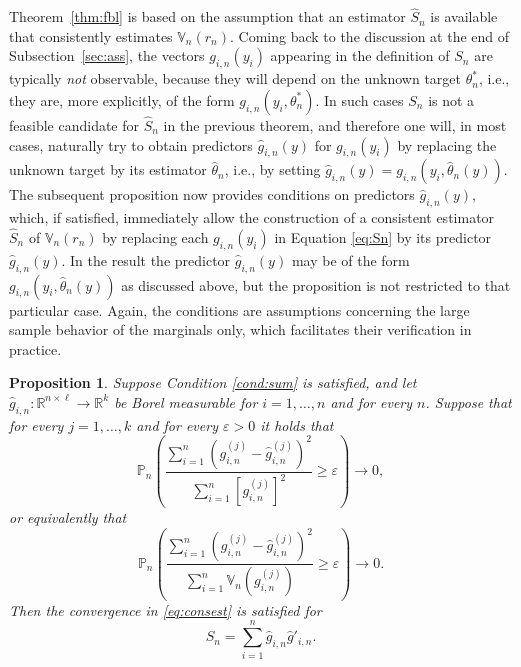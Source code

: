 \documentclass[preprint]{imsart}
\newcommand{\R}{{\mathbb R}}
\newtheorem{proposition}[theorem]{Proposition}
\numberwithin{equation}{section}
\begin{document}
Theorem~\ref{thm:fbl} is based on the assumption that an estimator $\hat{S}_n$ is available that consistently estimates $\mathbb{V}_n(r_n)$. Coming back to the discussion at the end of Subsection~\ref{sec:ass}, the vectors $g_{i,n}(y_i)$ appearing in the definition of $S_n$ are typically \textit{not} observable, because they will depend on the unknown target $\theta^*_n$, i.e., they are, more explicitly, of the form $g_{i,n}(y_i, \theta^*_n)$. In such cases $S_n$ is not a feasible candidate for $\hat{S}_n$ in the previous theorem, and therefore one will, in most cases, naturally try to obtain predictors $\hat{g}_{i,n}(y)$ for $g_{i,n}(y_i)$ by replacing the unknown target by its estimator $\hat{\theta}_n$, i.e., by setting $\hat{g}_{i,n}(y) = g_{i,n}(y_i, \hat{\theta}_n(y))$. The subsequent proposition now provides conditions on predictors $\hat{g}_{i,n}(y)$, which, if satisfied, immediately allow the construction of a consistent estimator $\hat{S}_n$ of $\mathbb{V}_n(r_n)$ by replacing each $g_{i,n}(y_i)$ in Equation \eqref{eq:Sn} by its predictor  $\hat{g}_{i,n}(y)$. In the result the predictor $\hat{g}_{i,n}(y)$ may be of the form $g_{i,n}(y_i, \hat{\theta}_n(y))$ as discussed above, but the proposition is not restricted to that particular case. Again, the conditions are assumptions concerning the large sample behavior of the marginals only, which facilitates their verification in practice.
%
\begin{proposition}\label{prop:obtest}
Suppose Condition \ref{cond:sum} is satisfied, and let $\hat{g}_{i,n}: \R^{n \times \ell} \to \R^k$ be Borel measurable for $i = 1, \hdots, n$ and for every $n$. Suppose that for every $j = 1, \hdots, k$ and for every $\varepsilon > 0$ it holds that
%
%
\begin{equation}\label{eq:negldiff}
\mathbb{P}_n \left( \frac{\sum_{i = 1}^n \left(g_{i,n}^{(j)} -  \hat{g}_{i,n}^{(j)} \right)^2}{\sum_{i = 1}^n [g_{i,n}^{(j)}]^2} \geq \varepsilon \right) \to 0, 
\end{equation}
%
or equivalently that 
%
\begin{equation}\label{eq:negldiff2}
\mathbb{P}_n \left( \frac{\sum_{i = 1}^n \left(g_{i,n}^{(j)} -  \hat{g}_{i,n}^{(j)} \right)^2}{\sum_{i = 1}^n \mathbb{V}_n \left( g_{i,n}^{(j)}\right)} \geq \varepsilon \right) \to 0.
\end{equation}
% 
Then the convergence in \eqref{eq:consest} is satisfied for
%
\begin{equation*}
\hat{S}_n = \sum_{i = 1}^n \hat{g}_{i,n}\hat{g}'_{i,n}.
\end{equation*}
%
\end{proposition}
\end{document}
